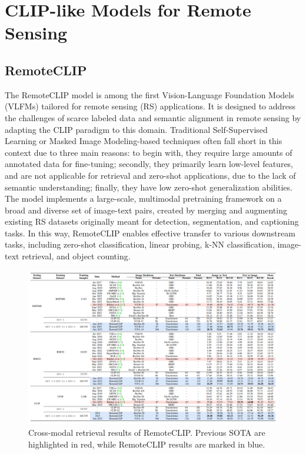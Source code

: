 \documentclass[a4paper, twoside, english]{sapthesis} %
\begin{document}
\section{CLIP-like Models for Remote Sensing}

\subsection{RemoteCLIP}

The RemoteCLIP model \cite{liu2024remoteclip} is among the first Vision-Language Foundation Models (VLFMs) tailored for remote sensing (RS) applications. It is designed to address the challenges of scarce labeled data and semantic alignment in remote sensing by adapting the CLIP paradigm to this domain. Traditional Self-Supervised Learning or Masked Image Modeling-based techniques often fall short in this context due to three main reasons: to begin with, they require large amounts of annotated data for fine-tuning; secondly, they primarily learn low-level features, and are not applicable for retrieval and zero-shot applications, due to the lack of semantic understanding; finally, they have low zero-shot generalization abilities.
The model implements a large-scale, multimodal pretraining framework on a broad and diverse set of image-text pairs, created by merging and augmenting existing RS datasets originally meant for detection, segmentation, and captioning tasks. In this way, RemoteCLIP enables effective transfer to various downstream tasks, including zero-shot classification, linear probing, k-NN classification, image-text retrieval, and object counting.

\begin{figure}[h]
    \centering
    \includegraphics[width=\textwidth]{img/remoteclip-retrieval-performance.png}
    \caption{\normalsize Cross-modal retrieval results of RemoteCLIP. Previous SOTA are highlighted in red, while RemoteCLIP results are marked in blue.}
    \label{fig:remoteclip-performance}
\end{figure}
\end{document}

